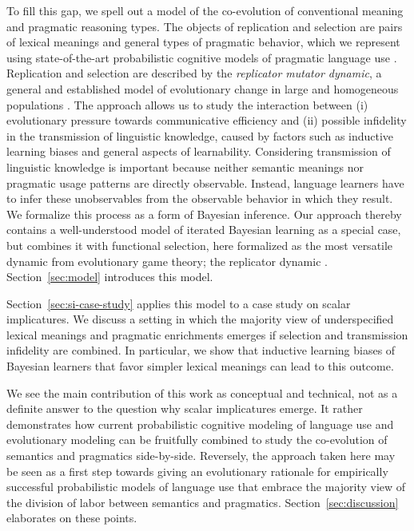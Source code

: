 \documentclass[a4paper]{article}
\begin{document}
To fill this gap, we spell out a model of the co-evolution of conventional meaning and
pragmatic reasoning types. The objects of replication and selection are pairs of lexical
meanings and general types of pragmatic behavior, which we represent using state-of-the-art
probabilistic cognitive models of pragmatic language use
\citep{frank+goodman:2012,FrankeJager2015:Probabilistic-p,GoodmanFrank2016:Pragmatic-Langu}. Replication
and selection are described by the \emph{replicator mutator dynamic}, a general and established
model of evolutionary change in large and homogeneous populations
\citep{Hofbauer1985:The-Selection-M,nowak+etal:2000,NowakKomarova2001:Evolution-of-Un,hofbauer+sigmund:2003,Nowak2006:Evolutionary-Dy}. The
approach allows us to study the interaction between (i) evolutionary pressure towards
communicative efficiency and (ii) possible infidelity in the transmission of linguistic
knowledge, caused by factors such as inductive learning biases and general aspects of learnability. Considering
transmission of linguistic knowledge is important because neither semantic meanings nor
pragmatic usage patterns are directly observable. Instead, language learners have to infer these
unobservables from the observable behavior in which they result. We formalize this 
process as a form of Bayesian inference. Our approach thereby contains a well-understood model
of iterated Bayesian learning \citep{griffiths+kalish:2007} as a special case, but combines it
with functional selection, here formalized as the most versatile dynamic from evolutionary game
theory; the replicator dynamic
\citep{TaylorJonker1978:Evolutionary-St}. Section~\ref{sec:model} introduces this model.

Section~\ref{sec:si-case-study} applies this model to a case study on scalar implicatures. We
discuss a setting in which the majority view of underspecified lexical meanings and pragmatic
enrichments emerges if selection and transmission infidelity are combined. In particular, we
show that inductive learning biases of Bayesian learners that favor simpler lexical meanings
can lead to this outcome. 

We see the main contribution of this work as conceptual and technical, not as a definite answer
to the question why scalar implicatures emerge. It rather demonstrates how current
probabilistic cognitive modeling of language use and evolutionary modeling can be fruitfully
combined to study the co-evolution of semantics and pragmatics side-by-side. Reversely, the
approach taken here may be seen as a first step towards giving an evolutionary rationale for
empirically successful probabilistic models of language use that embrace the majority view of
the division of labor between semantics and pragmatics. Section~\ref{sec:discussion} elaborates
on these points.
\end{document}
